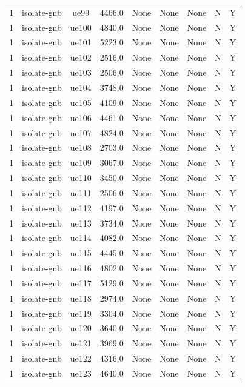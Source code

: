 \begin{table}[ht]
\begin{tabular}{|c|c|c|c|c|c|c|c|c|}
1 & isolate-gnb & ue99 & 4466.0 & None & None & None & N & Y \\
1 & isolate-gnb & ue100 & 4840.0 & None & None & None & N & Y \\
1 & isolate-gnb & ue101 & 5223.0 & None & None & None & N & Y \\
1 & isolate-gnb & ue102 & 2516.0 & None & None & None & N & Y \\
1 & isolate-gnb & ue103 & 2506.0 & None & None & None & N & Y \\
1 & isolate-gnb & ue104 & 3748.0 & None & None & None & N & Y \\
1 & isolate-gnb & ue105 & 4109.0 & None & None & None & N & Y \\
1 & isolate-gnb & ue106 & 4461.0 & None & None & None & N & Y \\
1 & isolate-gnb & ue107 & 4824.0 & None & None & None & N & Y \\
1 & isolate-gnb & ue108 & 2703.0 & None & None & None & N & Y \\
1 & isolate-gnb & ue109 & 3067.0 & None & None & None & N & Y \\
1 & isolate-gnb & ue110 & 3450.0 & None & None & None & N & Y \\
1 & isolate-gnb & ue111 & 2506.0 & None & None & None & N & Y \\
1 & isolate-gnb & ue112 & 4197.0 & None & None & None & N & Y \\
1 & isolate-gnb & ue113 & 3734.0 & None & None & None & N & Y \\
1 & isolate-gnb & ue114 & 4082.0 & None & None & None & N & Y \\
1 & isolate-gnb & ue115 & 4445.0 & None & None & None & N & Y \\
1 & isolate-gnb & ue116 & 4802.0 & None & None & None & N & Y \\
1 & isolate-gnb & ue117 & 5129.0 & None & None & None & N & Y \\
1 & isolate-gnb & ue118 & 2974.0 & None & None & None & N & Y \\
1 & isolate-gnb & ue119 & 3304.0 & None & None & None & N & Y \\
1 & isolate-gnb & ue120 & 3640.0 & None & None & None & N & Y \\
1 & isolate-gnb & ue121 & 3969.0 & None & None & None & N & Y \\
1 & isolate-gnb & ue122 & 4316.0 & None & None & None & N & Y \\
1 & isolate-gnb & ue123 & 4640.0 & None & None & None & N & Y \\

\end{tabular}
\end{table}
